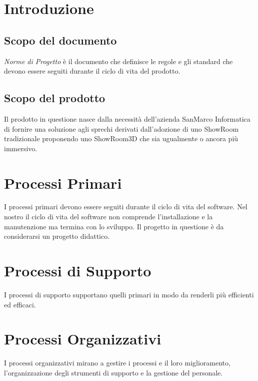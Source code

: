 \documentclass[a4paper]{article}
\begin{document}




\pagebreak

{
    \hypersetup{linkcolor=black}
    \tableofcontents
}
\pagebreak

\section{Introduzione}
\subsection{Scopo del documento}
\textit{Norme di Progetto} è il documento che definisce le regole e gli standard che devono essere seguiti durante il ciclo di vita del prodotto.
\subsection{Scopo del prodotto}
Il prodotto in questione nasce dalla necessità dell'azienda SanMarco Informatica di fornire una soluzione agli sprechi
derivati dall'adozione di uno ShowRoom tradizionale proponendo uno ShowRoom3D che sia ugualmente o ancora più immersivo.
\section{Processi Primari}
I processi primari devono essere seguiti durante il ciclo di vita del software.
Nel nostro il ciclo di vita del software non comprende l'installazione e la manutenzione ma termina con lo sviluppo.
Il progetto in questione è da considerarsi un progetto didattico.

\pagebreak
\section{Processi di Supporto}
I processi di supporto supportano quelli primari in modo da renderli più efficienti ed efficaci.

\pagebreak
\section{Processi Organizzativi}
I processi organizzativi mirano a gestire i processi e il loro miglioramento, l'organizzazione degli strumenti 
di supporto e la gestione del personale.

\pagebreak

\pagebreak

\pagebreak

\pagebreak
\end{document}
